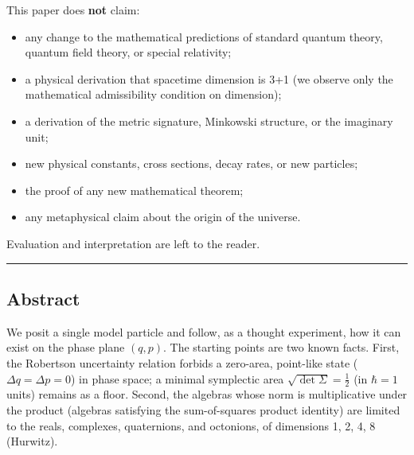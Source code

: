 \documentclass[
]{article}
\providecommand{\tightlist}{%
  \setlength{\itemsep}{0pt}\setlength{\parskip}{0pt}}
\begin{document}
This paper does \textbf{not} claim:

\begin{itemize}
\tightlist
\item
  any change to the mathematical predictions of standard quantum theory,
  quantum field theory, or special relativity;
\item
  a physical derivation that spacetime dimension is 3+1 (we observe only
  the mathematical admissibility condition on dimension);
\item
  a derivation of the metric signature, Minkowski structure, or the
  imaginary unit;
\item
  new physical constants, cross sections, decay rates, or new particles;
\item
  the proof of any new mathematical theorem;
\item
  any metaphysical claim about the origin of the universe.
\end{itemize}

Evaluation and interpretation are left to the reader.

\begin{center}\rule{0.5\linewidth}{0.5pt}\end{center}

\subsection{Abstract}\label{abstract}

We posit a single model particle and follow, as a thought experiment,
how it can exist on the phase plane \((q,p)\). The starting points are
two known facts. First, the Robertson uncertainty relation forbids a
zero-area, point-like state (\(\Delta q=\Delta p=0\)) in phase space; a
minimal symplectic area \(\sqrt{\det\Sigma}=\tfrac12\) (in \(\hbar=1\)
units) remains as a floor. Second, the algebras whose norm is
multiplicative under the product (algebras satisfying the sum-of-squares
product identity) are limited to the reals, complexes, quaternions, and
octonions, of dimensions 1, 2, 4, 8 (Hurwitz).
\end{document}
